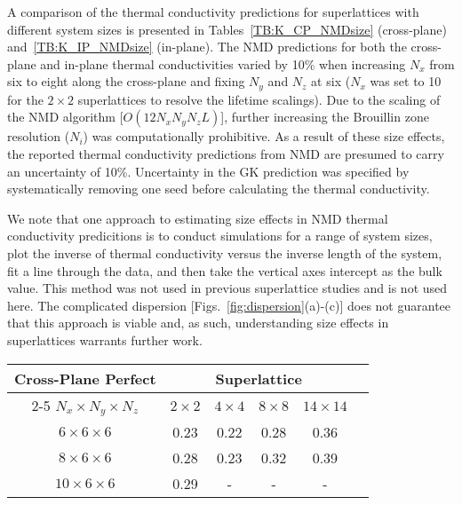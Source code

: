\documentclass[aps,prb,preprint,preprintnumbers,amsmath,amssymb,floatfix,superscriptaddress]{revtex4}
\begin{document}
A comparison of the thermal conductivity predictions for superlattices with different system sizes is presented in Tables~\ref{TB:K_CP_NMDsize} (cross-plane) and~\ref{TB:K_IP_NMDsize} (in-plane). The NMD predictions for both the cross-plane and in-plane thermal conductivities varied by 10\% when increasing $N_x$ from six to eight along the cross-plane and fixing $N_y$ and $N_z$ at six ($N_x$ was set to 10 for the $2\times2$ superlattices to resolve the lifetime scalings). %
Due to the scaling of the NMD algorithm [$O(12N_xN_yN_z L)$], further increasing the Brouillin zone resolution ($N_i$) was computationally prohibitive. As a result of these size effects, the reported thermal conductivity predictions from NMD are presumed to carry an uncertainty of 10\%. Uncertainty in the GK prediction was specified by systematically removing one seed before calculating the thermal conductivity.

We note that one approach to estimating size effects in NMD thermal conductivity predicitions is to conduct simulations for a range of system sizes, plot the inverse of thermal conductivity versus the inverse length of the system, fit a line through the data, and then take the vertical axes intercept as the bulk value.\cite{PhysRevB.81.214305}  %
This method was not used in previous superlattice studies \cite{doi:10.1021/nl202186y,savic:073113,Luckyanova16112012} and is not used here. The complicated dispersion [Figs.~\ref{fig:dispersion}(a)-(c)] does not guarantee that this approach is viable and, as such, understanding size effects in superlattices warrants further work.

\begin{table*}[h!]
\begin{center}
\begin{tabular*}{\textwidth}{c@{\extracolsep{\fill}}ccccc}
\hline\hline\noalign{\smallskip}
Cross-Plane Perfect& \multicolumn{4}{c}{Superlattice} \\
\cline{2-5}\noalign{\smallskip}
$N_x\times N_y \times N_z$ & $2\times2$ & $4\times4$ & $8\times8$ & $14\times14$  \\
\noalign{\smallskip}\hline\noalign{\smallskip}
$6\times6\times6$ & 0.23  & 0.22  &  0.28  &  0.36 \\
$8\times6\times6$ & 0.28  & 0.23  &  0.32  &  0.39 \\
$10\times6\times6$ & 0.29  &  - &  -  &  - \\
\hline\hline
\end{tabular*}
\end{center}
\renewcommand{\table}{Table.}
\caption{Size-dependent cross-plane thermal conductivity NMD predictions [W/m-K].}
\label{TB:K_CP_NMDsize}
\end{table*}
\end{document}
